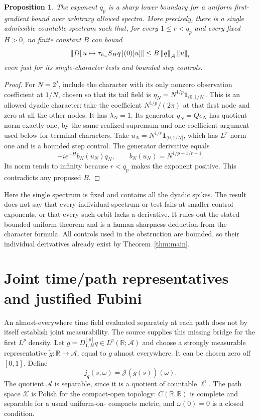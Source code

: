 \documentclass[11pt]{article}
\newtheorem{proposition}[theorem]{Proposition}
\theoremstyle{remark}\newtheorem{remark}[theorem]{Remark}
\newcommand{\R}{\mathbb R}\newcommand{\C}{\mathbb C}
\newcommand{\A}{\mathcal A}\newcommand{\X}{\mathcal X}
\begin{document}
\begin{proposition}\label{prop:exponentboundary}
The exponent $q_p$ is a sharp lower boundary for a uniform
first-gradient bound over arbitrary allowed spectra. More precisely,
there is a single admissible countable spectrum such that, for every
$1\le r<q_p$ and every fixed $H>0$, no finite constant $B$ can bound
\[
 \norm{D[\,u\mapsto\tau_{h_u}S_Hq\,](0)[u]}
       \le B\norm q_{\A}\norm u_r
\]
even just for its single-character tests and bounded step controls.
\end{proposition}
\begin{proof}
For $N=2^j$, include the character with its only nonzero observation
coefficient at $1/N$, chosen so that its tail field is
$\eta_N=N^{1/p}\mathbf1_{(0,1/N]}$. This is an allowed dyadic
character: take the coefficient $N^{1/p}/(2\pi)$ at that first node
and zero at all the other nodes. It has $\lambda_N=1$. Its generator
$q_N=Qe_N$ has quotient norm exactly one, by the same realized-supremum and one-coefficient argument used below for
terminal characters. Take
$u_N=N^{1/r}\mathbf1_{(0,1/N]}$, which has $L^r$ norm one and is a
bounded step control. The generator derivative equals
\[
 -i e^{-H}b_N(u_N)q_N,
 \qquad b_N(u_N)=N^{1/p+1/r-1}.
\]
Its norm tends to infinity because $r<q_p$ makes the exponent
positive. This contradicts any proposed $B$.
\end{proof}

Here the single spectrum is fixed and contains all the dyadic spikes.
The result does not say that every individual spectrum or test fails
at smaller control exponents, or that every such orbit lacks a
derivative. It rules out the stated bounded uniform theorem and is a
human sharpness deduction from the character formula. All controls
used in the obstruction are bounded, so their individual derivatives
already exist by Theorem~\ref{thm:main}.

\section{Joint time/path representatives and justified Fubini}\label{sec:joint}
An almost-everywhere time field evaluated separately at each path does
not by itself establish joint measurability. The source supplies this
missing bridge for the first $L^p$ density. Let
$g=D^{[p]}_{1,H}q\in L^p(\R;\A)$ and choose a strongly measurable
representative $\widetilde g:\R\to\A$, equal to $g$ almost
everywhere. It can be chosen zero off $[0,1]$. Define
\[
 j_q(s,\omega)=\mathcal J(\widetilde g(s))(\omega).
\]
The quotient $\A$ is separable, since it is a quotient of countable
$\ell^1$. The path space $\X$ is Polish for the compact-open
topology: $C(\R,\R)$ is complete and separable for a usual uniform-on-
compacts metric, and $\omega(0)=0$ is a closed condition.
\end{document}
